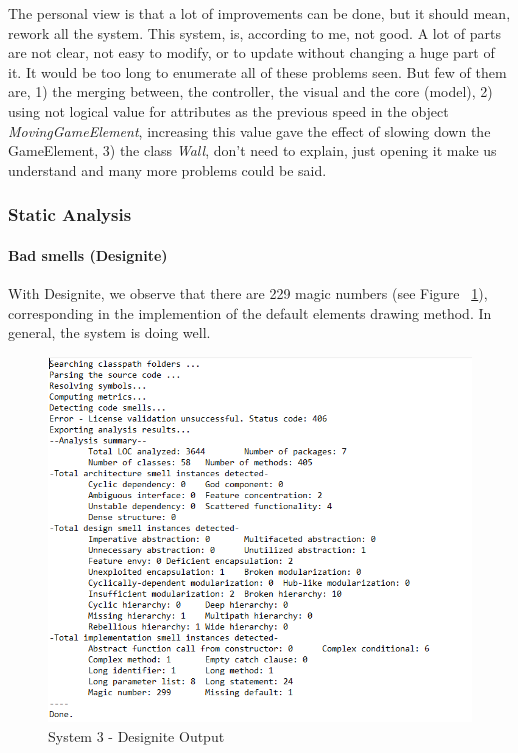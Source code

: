 \documentclass{article}
\begin{document}
The personal view is that a lot of improvements can be done, but it should mean, rework all the system. This system, is, according to me, not good. A lot of parts are not clear, not easy to modify, or to update without changing a huge part of it. It would be too long to enumerate all of these problems seen. But few of them are, 1) the merging between, the controller, the visual and the core (model), 2) using not logical value for attributes as the previous speed in the object \textit{MovingGameElement}, increasing this value gave the effect of slowing down the GameElement, 3) the class \textit{Wall}, don't need to explain, just opening it make us understand and many more problems could be said.\\

\subsubsection{Static Analysis}

\paragraph{Bad smells (Designite)} 
With Designite, we observe that there are 229 magic numbers (see Figure ~\ref{fig:system3EndStepDesignite}), corresponding in the implemention of the default elements drawing method. In general, the system is doing well. 

\begin{figure}
\centering
    \includegraphics[width=\linewidth]{imgs/system3LastStepDesignite.PNG}
    \caption{System 3 - Designite Output}
    \label{fig:system3EndStepDesignite}
\end{figure}
\end{document}

